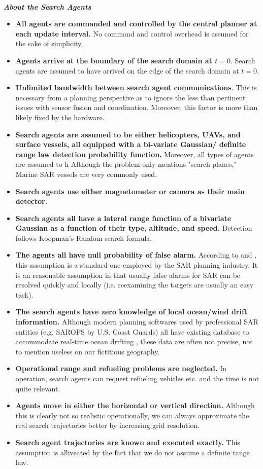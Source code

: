 \documentclass[12pt, letterpaper]{article}  %
\theoremstyle{definition}
\theoremstyle{remark}
\theoremstyle{plain}
\begin{document}
\ \\
\textit{\textbf{About the Search Agents}}
\begin{itemize}
\item \textbf{All agents are commanded and controlled by the central planner at each update interval.} No command and control overhead is assumed for the sake of simplicity.
\item \textbf{Agents arrive at the boundary of the search domain at $t=0$}.  Search agents are assumed to have arrived on the edge of the search domain at $t=0$.
\item \textbf{Unlimited bandwidth between search agent communications}.  This is necessary from a planning perspective as to ignore the less than pertinent issues with sensor fusion and coordination. Moreover, this factor is more than likely fixed by the hardware.
\item \textbf{Search agents are assumed to be either helicopters, UAVs, and surface vessels, all equipped with a bi-variate Gaussian/ definite range law detection probability function.} Moreover, all types of agents are assumed to h Although the problem only mentions "search planes," Marine SAR vessels are very commonly used.
\item \textbf{Search agents use either magnetometer or camera as their main detector.}
\item \textbf{Search agents all have a lateral range function of a bivariate Gaussian as a function of their type, altitude, and speed.} Detection follows Koopman's Random search formula.
\item \textbf{The agents all have null probability of false alarm.} According to \cite{83stone} and \cite{13kagan}, this assumption is a standard one employed by the SAR planning industry. It is an reasonable assumption in that usually false alarms for SAR can be resolved quickly and locally (i.e. reexamining the targets are usually an easy task).
\item \textbf{The search agents have zero knowledge of local ocean/wind drift information.} Although modern planning softwares used by professional SAR entities (e.g. SAROPS by U.S. Coast Guards) all have existing database to accommodate real-time ocean drifting \cite{10uscg}, these data are often not precise, not to mention useless on our fictitious geography.
\item \textbf{Operational range and refueling problems are neglected.} In operation, search agents can request refueling vehicles etc. and the time is not quite relevant.
\item \textbf{Agents move in either the horizontal or vertical direction.} Although this is clearly not so realistic operationally, we can always approximate the real search trajectories better by increasing grid resolution.
\item \textbf{Search agent trajectories are known and executed exactly.} This assumption is alliveated by the fact that we do not assume a definite range law.

\end{itemize}
\end{document}
